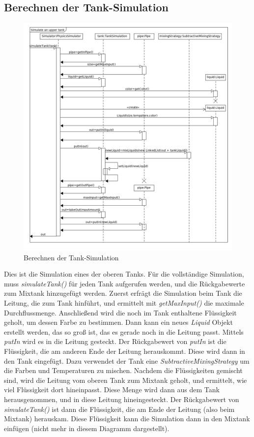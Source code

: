 \documentclass[parskip=full]{scrartcl}
\begin{document}
\subsection{Berechnen der Tank-Simulation}
\begin{figure}[H]
  \centering
  \includegraphics[scale=0.45]{design/sequence-diagrams/tank-simulation.png}
  \caption{Berechnen der Tank-Simulation}
\end{figure}
Dies ist die Simulation eines der oberen Tanks. Für die vollständige Simulation, muss \emph{simulateTank()} für jeden Tank aufgerufen werden,
und die Rückgabewerte zum Mixtank hinzugefügt werden. Zuerst erfrägt die Simulation beim Tank die Leitung, die zum Tank hinführt, und ermittelt
mit \emph{getMaxInput()} die maximale Durchflussmenge. Anschließend wird die noch im Tank enthaltene Flüssigkeit geholt, um dessen Farbe zu bestimmen.
Dann kann ein neues \emph{Liquid} Objekt erstellt werden, das so groß ist, das es gerade noch in die Leitung passt. Mittels \emph{putIn} wird es
in die Leitung gesteckt. Der Rückgabewert von \emph{putIn} ist die Flüssigkeit, die am anderen Ende der Leitung herauskommt. Diese wird dann in den
Tank eingefügt. Dazu verwendet der Tank eine \emph{SubtractiveMixingStrategy} um die Farben und Temperaturen zu mischen. Nachdem die Flüssigkeiten
gemischt sind, wird die Leitung vom oberen Tank zum Mixtank geholt, und ermittelt, wie viel Flüssigkeit dort hineinpasst. Diese Menge wird dann aus dem
Tank herausgenommen, und in diese Leitung hineingesteckt. Der Rückgabewert von \emph{simulateTank()} ist dann die Flüssigkeit, die am Ende der Leitung
(also beim Mixtank) herauskam. Diese Flüssigkeit kann die Simulation dann in den Mixtank einfügen (nicht mehr in diesem Diagramm dargestellt).
\end{document}
